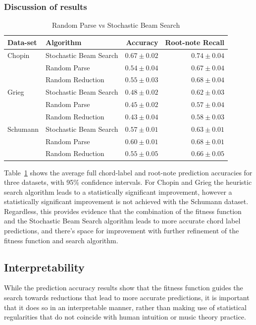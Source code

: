 \documentclass[12pt,a4paper,twoside,openany]{report} \usepackage[pdfborder={0 0 0}]{hyperref}    %
\theoremstyle{definition} \newtheorem{definition}{Definition}[section]
\begin{document}
  \subsubsection{Discussion of results}
\begin{table}[ht!] 
\caption{Random Parse vs Stochastic Beam Search} 
\label{tab:heursticRed} 
\centering
\begin{tabular}{llrr}
\toprule
 Data-set &  Algorithm                            &         Accuracy &      Root-note Recall \\
\midrule
 Chopin &  Stochastic Beam Search &  $\bm{0.67 \pm 0.02}$ &  $\bm{0.74 \pm 0.04}$ \\
         & Random Parse &  $0.54 \pm 0.04$ &  $0.67 \pm 0.04$ \\
         & Random Reduction &  $0.55 \pm 0.03$ &  $0.68 \pm 0.04$ \\
 Grieg & Stochastic Beam Search &  $\bm{0.48 \pm 0.02}$ &  $\bm{0.62 \pm 0.03}$ \\
         &   Random Parse &  $0.45 \pm 0.02$ &  $0.57 \pm 0.04$ \\
         &   Random Reduction &  $0.43 \pm 0.04$ &  $0.58 \pm 0.03$ \\
Schumann & Stochastic Beam Search &  $0.57 \pm 0.01$ &  $0.63 \pm 0.01$ \\
         & Random Parse &  $0.60 \pm 0.01$ &  $0.68 \pm 0.01$ \\
         & Random Reduction &  $0.55 \pm 0.05$ &  $0.66 \pm 0.05$ \\
\bottomrule
\end{tabular}
\end{table}

Table~\ref{tab:heursticRed} shows the average full chord-label and root-note prediction accuracies for three
datasets, with 95\% confidence intervals. For Chopin and Grieg the heuristic search algorithm leads to a statistically
significant improvement, however a statistically significant improvement is not achieved with the Schumann dataset. Regardless, this provides
evidence that the combination of the fitness function and the Stochastic Beam Search algorithm leads to more accurate
chord label predictions, and there's space for improvement with further refinement of the fitness function and search
algorithm.

  \subsection{Interpretability}
  \label{sub:evalInterpret}
  While the prediction accuracy results show that the fitness function guides the search towards reductions that lead to more
  accurate predictions, it is important that it does so in an interpretable manner, rather than making use of statistical regularities that do not coincide with human intuition or music theory practice.
\end{document}
